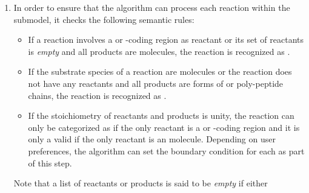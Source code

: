 \begin{enumerate}
  \item In order to ensure that the algorithm can process each reaction within the submodel, it checks the following semantic rules:
  \begin{itemize}
    \item If a reaction involves a \gene or {\gene}-coding region as reactant or its set of reactants is \emph{empty} and all products are \RNA molecules, the reaction is recognized as \transcription.
    \item If the substrate species of a reaction are \RNA molecules or the reaction does not have any reactants and all products are forms of \protein or poly-peptide chains, the reaction is recognized as \translation.
    \item If the stoichiometry of reactants and products is unity, the reaction can only be categorized as \transcription if the only reactant is a \gene or {\gene}-coding region and it is only a valid \translation if the only reactant is an \RNA molecule.
Depending on user preferences, the algorithm can set the boundary condition for each \gene as part of this step.
  \end{itemize}
Note that a list of reactants or products is said to be \emph{empty} if either 
\end{enumerate}

